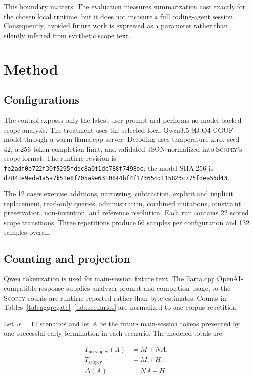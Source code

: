 \documentclass[10pt]{article}
\newcommand{\scopey}{\textsc{Scopey}\xspace}
\begin{document}
This boundary matters. The evaluation measures summarization cost exactly for
the chosen local runtime, but it does not measure a full coding-agent session.
Consequently, avoided future work is expressed as a parameter rather than
silently inferred from synthetic scope text.

\section{Method}

\subsection{Configurations}

The control exposes only the latest user prompt and performs no model-backed
scope analysis. The treatment uses the selected local Qwen3.5 9B Q4 GGUF model
through a warm llama.cpp server. Decoding uses temperature zero, seed 42, a
256-token completion limit, and validated JSON normalized into \scopey's scope
format. The runtime revision is
\texttt{fe2adf0e722f30f5\allowbreak{}295fdec8a0f1dc78\allowbreak{}8f7498bc}; the
model SHA-256 is
\texttt{d784ce9eda1a5a7b\allowbreak{}51e8f705a9e63108\allowbreak{}44bf4f173654d115\allowbreak{}823c775fdea56d43}.

The 12 cases exercise additions, narrowing, subtraction, explicit and implicit
replacement, read-only queries, administration, combined mutations,
constraint preservation, non-invention, and reference resolution. Each run
contains 22 scored scope transitions. Three repetitions produce 66 samples per
configuration and 132 samples overall.

\subsection{Counting and projection}

Qwen tokenization is used for main-session fixture text. The llama.cpp
OpenAI-compatible response supplies analyzer prompt and completion usage, so
the \scopey counts are runtime-reported rather than byte estimates. Counts in
Tables~\ref{tab:aggregate}--\ref{tab:scenarios} are normalized to one corpus
repetition.

Let $N=12$ scenarios and let $A$ be the future main-session tokens prevented by
one successful early termination in each scenario. The modeled totals are

\begin{align}
T_{\mathrm{no\ scopey}}(A) &= M + NA,\\
T_{\mathrm{scopey}} &= M + H,\\
\Delta(A) &= NA-H.
\end{align}
\end{document}
